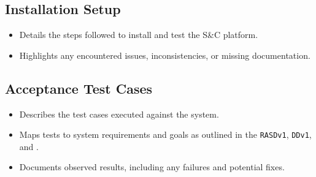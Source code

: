 \subsection*{Installation Setup}
\begin{itemize}
    \item Details the steps followed to install and test the S\&C platform.
    \item Highlights any encountered issues, inconsistencies, or missing documentation.
\end{itemize}

\subsection*{Acceptance Test Cases}
\begin{itemize}
    \item Describes the test cases executed against the system.
    \item Maps tests to system requirements and goals as outlined in the \texttt{RASDv1}, \texttt{DDv1}, and .
    \item Documents observed results, including any failures and potential fixes.
\end{itemize}

